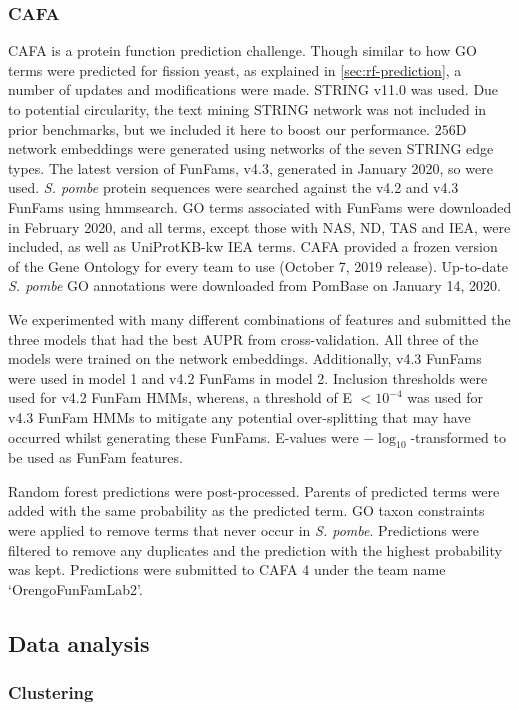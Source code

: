 \subsubsection{CAFA}

CAFA is a protein function prediction challenge. Though similar to how GO terms were predicted for fission yeast, as explained in \ref{sec:rf-prediction}, a number of updates and modifications were made. STRING v11.0 \cite{Szklarczyk2019} was used. Due to potential circularity, the text mining STRING network was not included in prior benchmarks, but we included it here to boost our performance. $256$D network embeddings were generated using networks of the seven STRING edge types. The latest version of FunFams, v4.3, generated in January 2020, so were used. \emph{S. pombe} protein sequences were searched against the v4.2 and v4.3 FunFams using hmmsearch. GO terms associated with FunFams were downloaded in February 2020, and all terms, except those with NAS, ND, TAS and IEA, were included, as well as UniProtKB-kw IEA terms. CAFA provided a frozen version of the Gene Ontology for every team to use (October 7, 2019 release). Up-to-date \emph{S. pombe} GO annotations were downloaded from PomBase on January 14, 2020.

We experimented with many different combinations of features and submitted the three models that had the best AUPR from cross-validation. All three of the models were trained on the network embeddings. Additionally, v4.3 FunFams were used in model 1 and v4.2 FunFams in model 2. Inclusion thresholds were used for v4.2 FunFam HMMs, whereas, a threshold of E $< 10^{-4}$ was used for v4.3 FunFam HMMs to mitigate any potential over-splitting that may have occurred whilst generating these FunFams. E-values were $-\log_{10}$-transformed to be used as FunFam features.

Random forest predictions were post-processed. Parents of predicted terms were added with the same probability as the predicted term. GO taxon constraints were applied to remove terms that never occur in \emph{S. pombe}. Predictions were filtered to remove any duplicates and the prediction with the highest probability was kept. Predictions were submitted to CAFA 4 under the team name `OrengoFunFamLab2'.


\subsection{Data analysis}

\subsubsection{Clustering}

